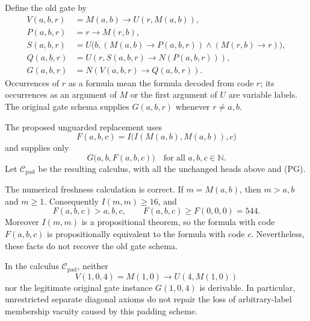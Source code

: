 Define the old gate by
\begin{align*}
 V(a,b,r)&=M(a,b)\to U(r,M(a,b)),\\
 P(a,b,r)&=r\to M(r,b),\\
 S(a,b,r)&=U\bigl(b,
    (M(a,b)\to P(a,b,r))\wedge(M(r,b)\to r)\bigr),\\
 Q(a,b,r)&=U(r,S(a,b,r)\to N(P(a,b,r))),\\
 G(a,b,r)&=N(V(a,b,r)\to Q(a,b,r)).
\end{align*}
Occurrences of $r$ as a formula mean the formula decoded from code $r$;
its occurrences as an argument of $M$ or the first argument of $U$ are
variable labels. The original gate schema supplies $G(a,b,r)$ whenever
$r\ne a,b$.

The proposed unguarded replacement uses
\[
 F(a,b,c)=I\bigl(I(M(a,b),M(a,b)),c\bigr)
\]
and supplies only
\[
 G\bigl(a,b,F(a,b,c)\bigr)
 \quad\text{for all }a,b,c\in\mathbb N.
 \tag{PG}
\]
Let $\mathcal C_{\mathrm{pad}}$ be the resulting calculus, with all the
unchanged heads above and (PG).

The numerical freshness calculation is correct. If $m=M(a,b)$, then
$m>a,b$ and $m\ge1$. Consequently $I(m,m)\ge16$, and
\[
 F(a,b,c)>a,b,c,\qquad F(a,b,c)\ge F(0,0,0)=544.
 \tag{1}
\]
Moreover $I(m,m)$ is a propositional theorem, so the formula with code
$F(a,b,c)$ is propositionally equivalent to the formula with code $c$.
Nevertheless, these facts do not recover the old gate schema.

\begin{theorem}
\label{thm:padding-alias}
In the calculus $\mathcal C_{\mathrm{pad}}$, neither
\[
 V(1,0,4)=M(1,0)\to U(4,M(1,0))
\]
nor the legitimate original gate instance $G(1,0,4)$ is derivable.
In particular, unrestricted separate diagonal axioms do not repair the
loss of arbitrary-label membership vacuity caused by this padding scheme.
\end{theorem}

